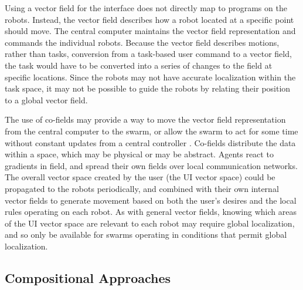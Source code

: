 Using a vector field for the interface does not directly map to programs on the robots. 
Instead, the vector field describes how a robot located at a specific point should move. 
The central computer maintains the vector field representation and commands the individual robots.
Because the vector field describes motions, rather than tasks, conversion from a task-based user command to a vector field, the task would have to be converted into a series of changes to the field at specific locations.
Since the robots may not have accurate localization within the task space, it may not be possible to guide the robots by relating their position to a global vector field. 

The use of co-fields may provide a way to move the vector field representation from the central computer to the swarm, or allow the swarm to act for some time without constant updates from a central controller \citep{mamei2003co}.
Co-fields distribute the data within a space, which may be physical or may be abstract. 
Agents react to gradients in field, and spread their own fields over local communication networks. 
The overall vector space created by the user (the UI vector space) could be propagated to the robots periodically, and combined with their own internal vector fields to generate movement based on both the user's desires and the local rules operating on each robot. 
As with general vector fields, knowing which areas of the UI vector space are relevant to each robot may require global localization, and so only be available for swarms operating in conditions that permit global localization. 

\subsection{Compositional Approaches} \label{section:Compositional_Approaches}

